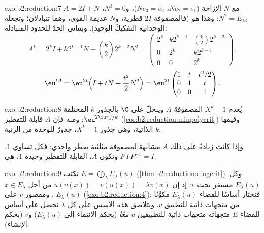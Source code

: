\begin{solution}{exo:b2:reduction:7}
$A = 2I + N$ مع $N$ الإزاحة ($N e_2 = e_1$، $Ne_3 = e_2$)،
و$N^3 = 0$، $N^2 = E_{13}$: وهذا \emph{هو} 
(فالمصفوفة $2I$ قطرية، و$N$ عديمة القوى، وهما تتبادلان؛ وتجعله الوحدانية
التفكيكَ الوحيد). وبثنائي الحدّ للحدود المتبادلة:
\[
A^k = 2^k I + k 2^{k-1} N + \binom k2 2^{k-2} N^2
= \begin{pmatrix}
2^k & k2^{k-1} & \binom k2 2^{k-2}\\
0 & 2^k & k2^{k-1}\\
0 & 0 & 2^k
\end{pmatrix},
\]
\[
\eu^{tA} = \eu^{2t}\Bigl(I + tN + \frac{t^2}{2}N^2\Bigr)
= \eu^{2t}\begin{pmatrix}
1 & t & t^2/2\\
0 & 1 & t\\
0 & 0 & 1
\end{pmatrix}.
\]
\end{solution}

\begin{solution}{exo:b2:reduction:8}
يُعدم $X^k - 1$ المصفوفةَ $A$ وينحلّ على $\C$ بالجذور $k$ المختلفة
$\eu^{2\iu\pi j/k}$: ومنه فإن $A$ قابلة للتقطير
(\cref{cor:b2:reduction:minpolycrit}) وقيمها الذاتية، وهي جذور
$X^k - 1$، جذورٌ للوحدة من الرتبة $k$.

وإذا كانت زيادةً على ذلك $A$ مشابهة لمصفوفة مثلثية بقطر
واحدي: فكل  تساوي $1$، وتكون $A$، القابلة للتقطير
 وحيدة $1$، هي $P\,I\,P^{-1} = I$.
\end{solution}

\begin{solution}{exo:b2:reduction:9}
نكتب $E = \bigoplus_\lambda E_\lambda(u)$
(\cref{thm:b2:reduction:diagcrit}). وكل $E_\lambda(u)$
مستقر تحت $v$: إذ إن $u(v(x)) = v(u(x)) = \lambda
v(x)$ من أجل $x \in E_\lambda$. ومقصور $v$ على $E_\lambda(u)$ 
(\cref{exo:b2:reduction:4}): فنختار أساسًا للفضاء $E_\lambda(u)$ مكوَّنًا
من متجهات ذاتية للتطبيق $v$. وبتلاصق هذه الأسس على كل $\lambda$
نحصل على أساس للفضاء $E$ متجهاته متجهات ذاتية للتطبيقين
$u$ \emph{معًا} (بحكم الانتماء إلى $E_\lambda(u)$) و$v$ (بحكم الإنشاء).
\end{solution}

